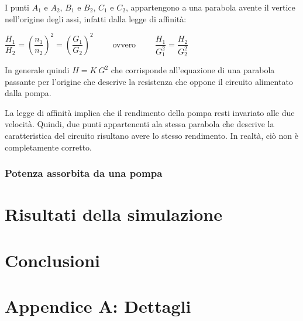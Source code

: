 \documentclass[laurea,oneside,11pt]{USiena_tesiLM}
\begin{document}
I punti $A_1$ e $A_2$, $B_1$ e $B_2$, $C_1$ e $C_2$, appartengono a una parabola avente il vertice nell'origine degli assi, infatti dalla legge di affinità:
\begin{center}
$\dfrac{H_1}{H_2}=\left(\dfrac{n_1}{n_2} \right)^2 = \left(\dfrac{G_1}{G_2} \right)^2  \qquad$ ovvero   $\qquad \dfrac{H_1}{G_1^2}=\dfrac{H_2}{G_2^2}$ 
\end{center}
In generale quindi $H = K \ G^2$ che corrisponde all'equazione di una parabola passante per l'origine che descrive la resistenza che oppone il circuito alimentato dalla pompa.

La legge di affinità implica che il rendimento della pompa resti invariato alle due velocità. Quindi, due punti appartenenti ala stessa parabola che descrive la caratteristica del circuito risultano avere lo stesso rendimento. In realtà, ciò non è completamente corretto.


\subsection{Potenza assorbita da una pompa}
%
\chapter{Risultati della simulazione}

\chapter{Conclusioni}


\backmatter

\appendix
\chapter{Appendice A: Dettagli}
%


%



%

\end{document}
